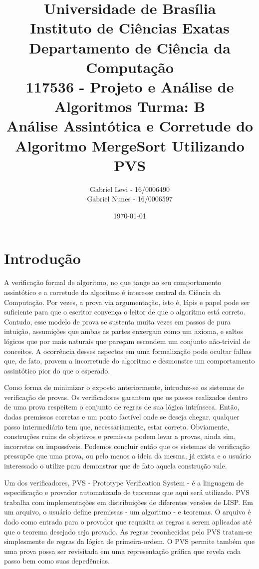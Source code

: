 \documentclass[12pt]{article}
\title{{\large Universidade de Brasília \\ Instituto de Ciências Exatas \\
Departamento de Ciência da Computação} \\[1cm]
117536 - Projeto e Análise de Algoritmos Turma: B\\[.5cm]
Análise Assintótica e Corretude do Algoritmo MergeSort Utilizando PVS}
\author{Gabriel Levi - 16/0006490 \\
        Gabriel Nunes - 16/0006597}
\date{\today}
\theoremstyle{definition}
\begin{document}
\maketitle
\newpage

\section{Introdução}
\noindent A verificação formal de algoritmo, no que tange ao seu comportamento assintótico e a corretude do algoritmo é interesse
central da Ciência da Computação. Por vezes, a prova via argumentação, isto é, lápis e papel pode ser suficiente para que o escritor
convença o leitor de que o algoritmo está correto. Contudo, esse modelo de prova se sustenta muita vezes em passos de pura intuição,
assumições que ambas as partes enxergam como um axioma, e saltos lógicos que por mais naturais que pareçam escondem um conjunto não-trivial
de conceitos. A ocorrência desses aspectos em uma formalização pode ocultar falhas que, de fato, provem a incorretude do algoritmo e desmonstre
um comportamento assintótico pior do que o esperado.

Como forma de minimizar o exposto anteriormente, introduz-se os sistemas de verificação de provas. Os verificadores garantem que os passos realizados
dentro de uma prova respeitem o conjunto de regras de sua lógica intrínseca. Então, dadas premissas corretas e um ponto factível onde se deseja chegar, qualquer
passo intermediário tem que, necessariamente, estar correto. Obviamente, construções ruins de objetivos e premissas podem levar a provas, ainda sim, incorretas
ou impossíveis. Podemos concluir então que os sistemas de verificação pressupõe que uma prova, ou pelo menos a ideia da mesma, já exista e o usuário interessado
o utilize para demonstrar que de fato aquela construção vale.

Um dos verificadores, PVS - Prototype Verification System - é a linguagem de especificação e provador automatizado de teoremas que aqui será utilizado.
PVS trabalha com implementações em distribuições de diferentes versões de LISP. Em um arquivo, o usuário define premissas - um algoritmo - e teoremas.
O arquivo é dado como entrada para o provador que requisita as regras a serem aplicadas até que o teorema desejado seja provado. As regras reconhecidas pelo
PVS tratam-se simplesmente de regras da lógica de primeira-ordem. O PVS permite também que uma prova possa ser revisitada em uma representação gráfica que
revela cada passo bem como suas depedências.
\end{document}
